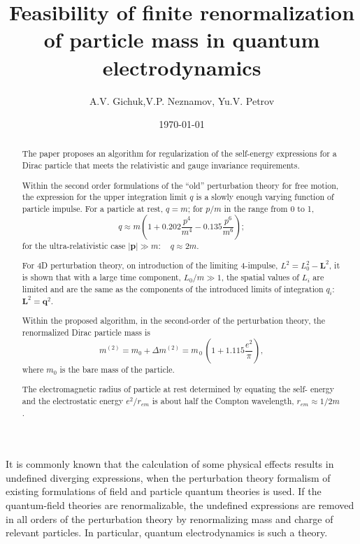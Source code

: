 \documentclass[a4paper,draft,showpacs,preprint,prd,aps]{revtex4}
\begin{document}
\title{Feasibility of finite renormalization of particle mass in quantum
electrodynamics}
\author{A.V. Gichuk,V.P. Neznamov, Yu.V. Petrov}
\date{\today}
\begin{abstract}
The paper proposes an algorithm for regularization of the self-energy
expressions for a Dirac particle that meets the relativistic and gauge
invariance requirements.

Within the second order formulations of the ``old'' perturbation theory for
free
motion, the expression for the upper integration limit $q$ is a slowly
enough varying function of particle impulse. For a particle at
rest, $q=m$; for $p/m$ in the range from 0 to 1,
\[
q \approx m\left( {1 + 0.202\frac{{p^{4}}}{{m^{4}}} -
0.135\frac{{p^{6}}}{{m^{6}}}} \right);
\]
for the ultra-relativistic case $|\bm{p}| \gg m:\quad q \approx 2m$.

For 4D perturbation theory, on introduction of the limiting 4-impulse,
$L^2 = L_0^2 - \bm{L}^2$, it is shown that with a large time
component, $L_0/m\gg 1$, the spatial values of
$L_i$ are limited and are the same as the components of the
introduced limits of integration $q_i$:
$\bm{L}^2 = \bm{q}^2$.

Within the proposed algorithm, in the second-order of the perturbation
theory, the renormalized Dirac particle mass is
\[
m^{\left( {2} \right)} = m_{0} + \Delta m^{\left( {2} \right)} = m_{\,0}
\,\left( {1 + 1.115\frac{{e^{2}}}{{\pi} }} \right),
\]
where $m_0$ is the bare mass of the particle.

The electromagnetic radius of particle at rest determined by equating the
self- energy and the electrostatic energy $e^2/r_{em}$ is about half the
Compton wavelength, $r_{em} \approx 1/2m$.

\end{abstract}
\maketitle
It is commonly known that the calculation of some physical effects results
in undefined diverging expressions, when the perturbation theory formalism
of existing formulations of field and particle quantum theories is used. If
the quantum-field theories are renormalizable, the undefined expressions are
removed in all orders of the perturbation theory by renormalizing mass and
charge of relevant particles. In particular, quantum electrodynamics is such
a theory.
\end{document}
